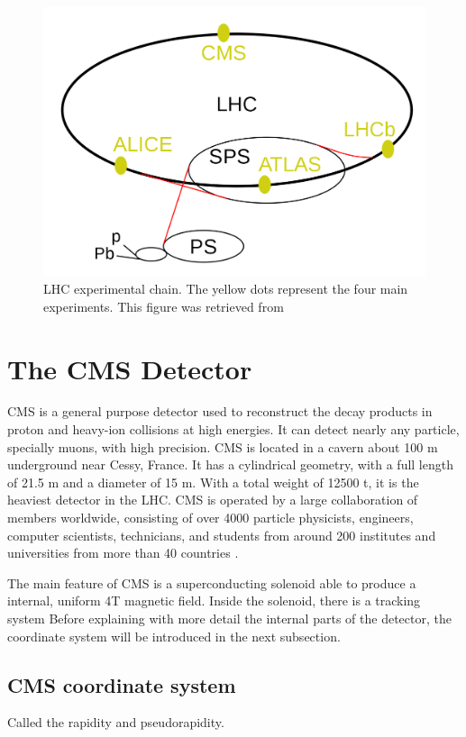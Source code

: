 \begin{figure}[htp!]
	\centering
	\includegraphics[scale=0.3]{MainContent/Figs/LHC.png}
	\caption{LHC experimental chain. The yellow dots represent the four main experiments. This figure was retrieved from }
	\label{fig:LHC}
\end{figure}

\section{The CMS Detector}

CMS is a general purpose detector used to reconstruct the decay products in proton and heavy-ion collisions at high energies. It can detect nearly any particle, specially muons, with high precision. CMS is located in a cavern about 100 m underground near Cessy, France. It has a cylindrical geometry, with a full length of 21.5 m and a diameter of 15 m. With a total weight of 12500 t, it is the heaviest detector in the LHC. CMS is operated by a large collaboration of members worldwide, consisting of over 4000 particle physicists, engineers, computer scientists, technicians, and students from around 200 institutes and universities from more than 40 countries \cite{cms_collab}.

The main feature of CMS is a superconducting solenoid able to produce a internal, uniform 4T magnetic field. Inside the solenoid, there is a tracking system  Before explaining with more detail the internal parts of the detector, the coordinate system will be introduced in the next subsection. 

\subsection{CMS coordinate system}
Called the rapidity and pseudorapidity.